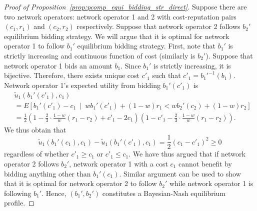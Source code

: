 \begin{proof}[Proof of Proposition~\ref{prop:pcomp_equi_bidding_str_direct}]
Suppose there are two network operators: network operator 1 and 2 with cost-reputation pairs $(c_1,r_1)$ and $(c_2,r_2)$ respectively. Suppose that network operator 2 follows $b_2'$ equilibrium bidding strategy. We will argue that it is optimal for network operator 1 to follow $b_1'$ equilibrium bidding strategy. First, note that $b_1'$ is strictly increasing and continuous function of cost (similarly is $b_2'$). Suppose that network operator 1 bids an amount $b_1$. Since $b_1'$ is strictly increasing, it is bijective. Therefore, there exists unique cost $c'_1$ such that $c'_1 = {b_1'}^{-1}(b_1)$. Network operator 1's expected utility from bidding $b_1'(c'_1)$ is
\begin{align*}
	&\tilde{u}_1(b_1'(c'_1), c_1) \\
	&= E \left[ b_1'(c'_1) - c_1 \:\middle\vert\: wb_1'(c'_1) + (1-w)r_1 < wb_2'(c_2) + (1-w)r_2 \right] \\
	&= \frac{1}{2} \left( 1 - \frac{2}{3}\cdot\frac{1-w}{w}(r_1-r_2) + c'_1 - 2c_1 \right) \left( 1 - c'_1 - \frac{2}{3}\cdot\frac{1-w}{w}(r_1-r_2) \right).
\end{align*}
We thus obtain that
\begin{equation*}
	\tilde{u}_1(b_1'(c_1), c_1) - \tilde{u}_1(b_1'(c'_1), c_1) = \frac{1}{2}(c_1-c'_1)^2 \ge 0
\end{equation*}
regardless of whether $c'_1\ge c_1$ or $c'_1 \le c_1$. We have thus argued that if network operator 2 follows $b_2'$, network operator 1 with a cost $c_1$ cannot benefit by bidding anything other than $b_1'(c_1)$. Similar argument can be used to show that it is optimal for network operator 2 to follow $b_2'$ while network operator 1 is following $b_1'$. Hence, $(b_1',b_2')$ constitutes a Bayesian-Nash equilibrium profile.
\end{proof}

